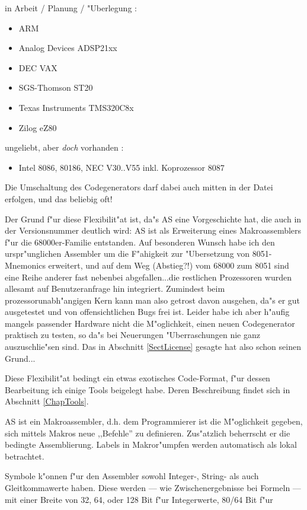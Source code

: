 \documentclass[12pt,a4paper,twoside]{report}
\newcommand{\asname}{AS}
\begin{document}
in Arbeit / Planung / "Uberlegung :
\begin{itemize}
\item{ARM}
\item{Analog Devices ADSP21xx}
\item{DEC VAX}
\item{SGS-Thomson ST20}
\item{Texas Instruments TMS320C8x}
\item{Zilog eZ80}
\end{itemize}
ungeliebt, aber {\it doch} vorhanden :
\begin{itemize}
\item{Intel 8086, 80186, NEC V30..V55 inkl. Koprozessor 8087}
\end{itemize}
Die Umschaltung des Codegenerators darf dabei auch mitten in der Datei
erfolgen, und das beliebig oft!
\par
Der Grund f"ur diese Flexibilit"at ist, da"s \asname{} eine Vorgeschichte hat,
die auch in der Versionsnummer deutlich wird: \asname{} ist als Erweiterung eines
Makroassemblers f"ur die 68000er-Familie entstanden.  Auf besonderen
Wunsch habe ich den urspr"unglichen Assembler um die F"ahigkeit zur
"Ubersetzung von 8051-Mnemonics erweitert, und auf dem Weg (Abstieg?!) vom
68000 zum 8051 sind eine Reihe anderer fast nebenbei abgefallen...die
restlichen Prozessoren wurden allesamt auf Benutzeranfrage hin integriert.
Zumindest beim prozessorunabh"angigen Kern kann man also getrost davon
ausgehen, da"s er gut ausgetestet und von offensichtlichen Bugs frei ist.
Leider habe ich aber h"aufig mangels passender Hardware nicht die
M"oglichkeit, einen neuen Codegenerator praktisch zu testen, so da"s bei
Neuerungen "Uberraschungen nie ganz auszuschlie"sen sind.  Das in
Abschnitt \ref{SectLicense} gesagte hat also schon seinen Grund...
\par
Diese Flexibilit"at bedingt ein etwas exotisches Code-Format, f"ur dessen
Bearbeitung ich einige Tools beigelegt habe.  Deren Beschreibung findet
sich in Abschnitt \ref{ChapTools}.
\par
\asname{} ist ein Makroassembler, d.h. dem Programmierer ist die M"oglichkeit
gegeben, sich mittels Makros neue ,,Befehle'' zu definieren.  Zus"atzlich
beherrscht er die bedingte Assemblierung.  Labels in Makror"umpfen werden
automatisch als lokal betrachtet.
\par
Symbole k"onnen f"ur den Assembler sowohl Integer-, String- als auch
Gleitkommawerte haben.  Diese werden --- wie Zwischenergebnisse bei Formeln
--- mit einer Breite von 32, 64, oder 128 Bit f"ur Integerwerte, 80/64 Bit f"ur
\end{document}
